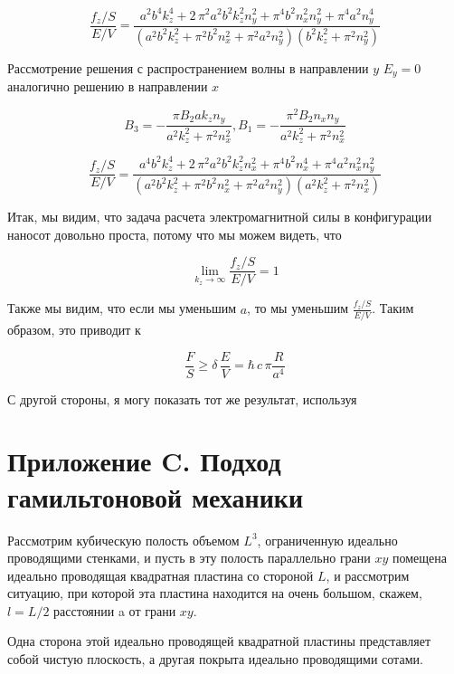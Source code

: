 \documentclass[11pt]{article}
\begin{document}
\[\frac{f_z/S}{E/V} = \frac{a^{2} b^{4} k_{z}^{4} + 2 \, \pi^{2} a^{2} b^{2} k_{z}^{2} n_{y}^{2} + \pi^{4} b^{2} n_{x}^{2} n_{y}^{2} + \pi^{4} a^{2} n_{y}^{4}}{{\left(a^{2} b^{2} k_{z}^{2} + \pi^{2} b^{2} n_{x}^{2} + \pi^{2} a^{2} n_{y}^{2}\right)} {\left(b^{2} k_{z}^{2} + \pi^{2} n_{y}^{2}\right)}}\]

Рассмотрение решения с распространением волны в направлении \(y\)
\(E_y = 0\) аналогично решению в направлении \(x\)

    \[B_3 = -\frac{\pi B_{2} a k_{z} n_{y}}{a^{2} k_{z}^{2} + \pi^{2} n_{x}^{2}}, 
B_1 = -\frac{\pi^{2} B_{2} n_{x} n_{y}}{a^{2} k_{z}^{2} + \pi^{2} n_{x}^{2}}\]

\[\frac{f_z/S}{E/V} = \frac{a^{4} b^{2} k_{z}^{4} + 2 \, \pi^{2} a^{2} b^{2} k_{z}^{2} n_{x}^{2} + \pi^{4} b^{2} n_{x}^{4} + \pi^{4} a^{2} n_{x}^{2} n_{y}^{2}}{{\left(a^{2} b^{2} k_{z}^{2} + \pi^{2} b^{2} n_{x}^{2} + \pi^{2} a^{2} n_{y}^{2}\right)} {\left(a^{2} k_{z}^{2} + \pi^{2} n_{x}^{2}\right)}}\]

    Итак, мы видим, что задача расчета электромагнитной силы в конфигурации
наносот довольно проста, потому что мы можем видеть, что

\[\lim_{k_z \to \infty}\frac{f_z/S}{E/V} = 1\]

Также мы видим, что если мы уменьшим \(a\), то мы уменьшим
\(\frac{f_z/S}{E/V}\). Таким образом, это приводит к

\[\frac{F}{S} \geq \delta\,\frac{E}{V} = \hbar\,c\, \pi\frac{R}{a^4}\]

С другой стороны, я могу показать тот же результат, используя

    \section{Приложение C. Подход гамильтоновой
механики}\label{ux43fux440ux438ux43bux43eux436ux435ux43dux438ux435-c.-ux43fux43eux434ux445ux43eux434-ux433ux430ux43cux438ux43bux44cux442ux43eux43dux43eux432ux43eux439-ux43cux435ux445ux430ux43dux438ux43aux438}

    Рассмотрим кубическую полость объемом \(L^3\), ограниченную идеально
проводящими стенками, и пусть в эту полость параллельно грани \(xy\)
помещена идеально проводящая квадратная пластина со стороной \(L\), и
рассмотрим ситуацию, при которой эта пластина находится на очень
большом, скажем, \(l = L/2\) расстоянии a от грани \(xy\).

Одна сторона этой идеально проводящей квадратной пластины представляет
собой чистую плоскость, а другая покрыта идеально проводящими сотами.
\end{document}
